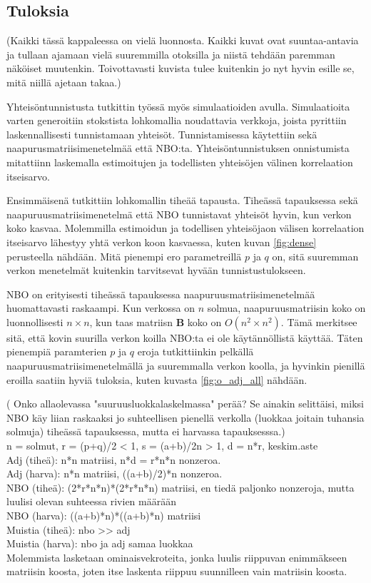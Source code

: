 \documentclass[finnish,12pt,a4paper,pdftex,sci,utf8]{aaltothesis}
\begin{document}
\subsection{Tuloksia}
(Kaikki tässä kappaleessa on vielä luonnosta. Kaikki kuvat ovat suuntaa-antavia ja tullaan ajamaan vielä suuremmilla otoksilla ja niistä tehdään paremman näköiset muutenkin. Toivottavasti kuvista tulee kuitenkin jo nyt hyvin esille se, mitä niillä ajetaan takaa.)

Yhteisöntunnistusta tutkittin työssä myös simulaatioiden avulla. Simulaatioita varten generoitiin stokstista lohkomallia noudattavia verkkoja, joista pyrittiin laskennallisesti tunnistamaan yhteisöt. Tunnistamisessa käytettiin sekä naapurusmatriisimenetelmää että NBO:ta. Yhteisöntunnistuksen onnistumista mitattiinn laskemalla estimoitujen ja todellisten yhteisöjen välinen korrelaation itseisarvo.

Ensimmäisenä tutkittiin lohkomallin tiheää tapausta. Tiheässä tapauksessa sekä naapuruusmatriisimenetelmä että NBO tunnistavat yhteisöt hyvin, kun verkon koko kasvaa. Molemmilla estimoidun ja todellisen yhteisöjaon välisen korrelaation itseisarvo lähestyy yhtä verkon koon kasvaessa, kuten kuvan \ref{fig:dense} perusteella nähdään. Mitä pienempi ero parametreillä $p$ ja $q$ on, sitä suuremman verkon menetelmät kuitenkin tarvitsevat hyvään tunnistustulokseen.

NBO on erityisesti tiheässä tapauksessa naapuruusmatriisimenetelmää huomattavasti raskaampi. Kun verkossa on $n$ solmua, naapuruusmatriisin koko on luonnollisesti $n \times n$, kun taas matriisn $\mathbf{B}$ koko on $O(n^2 \times n^2)$. Tämä merkitsee sitä, että kovin suurilla verkon koilla NBO:ta ei ole käytännöllistä käyttää. Täten pienempiä paramterien $p$ ja $q$ eroja tutkittiinkin pelkällä naapuruusmatriisimenetelmällä ja suuremmalla verkon koolla, ja hyvinkin pienillä eroilla saatiin hyviä tuloksia, kuten kuvasta \ref{fig:o_adj_all} nähdään.

( Onko allaolevassa "suuruusluokkalaskelmassa" perää? Se ainakin selittäisi, miksi NBO käy liian raskaaksi jo suhteellisen pienellä verkolla (luokkaa joitain tuhansia solmuja) tiheässä tapauksessa, mutta ei harvassa tapauksesssa.) \\
n = solmut, r = (p+q)/2 < 1, s = (a+b)/2n > 1, d = n*r, keskim.aste \\
Adj (tiheä): n*n matriisi, n*d = r*n*n nonzeroa. \\
Adj (harva): n*n matriisi, ((a+b)/2)*n nonzeroa. \\
NBO (tiheä): (2*r*n*n)*(2*r*n*n) matriisi, en tiedä paljonko nonzeroja, mutta luulisi olevan suhteessa rivien määrään \\
NBO (harva): ((a+b)*n)*((a+b)*n) matriisi \\
Muistia (tiheä): nbo >> adj \\
Muistia (harva): nbo ja adj samaa luokkaa  \\
Molemmista lasketaan ominaisvekroteita, jonka luulis riippuvan enimmäkseen matriisin koosta, joten itse laskenta riippuu suunnilleen vain matriisin koosta. \\
\end{document}

